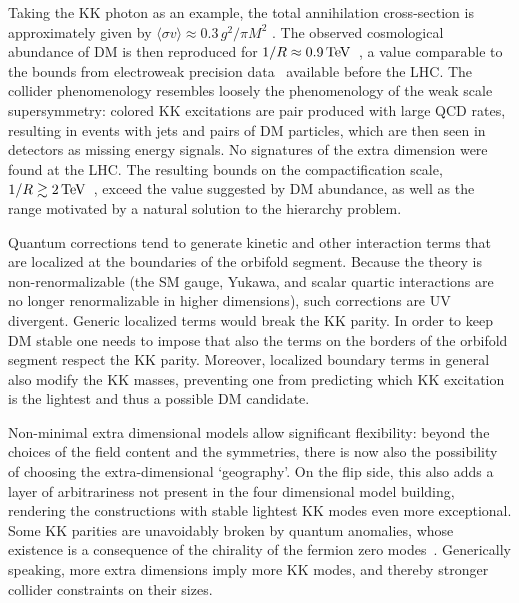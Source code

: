 \smallskip

Taking the KK photon as an example, the total annihilation cross-section is approximately given by 
$\langle \sigma v\rangle \approx 0.3 \, g^2/\pi M^2$ \cite{xdimDM}.
The observed cosmological abundance of DM is then reproduced for $1/R \approx 0.9\,{\rm TeV}$~\cite{xdimDM}, 
a value comparable to the bounds from electroweak precision data~\cite{xdimDM} available before the LHC.
The collider phenomenology  resembles loosely the phenomenology of the weak scale supersymmetry:
colored KK excitations are pair produced with large QCD rates, resulting in events with jets and pairs of DM particles, which are then seen in detectors as missing energy signals.
No signatures of the extra dimension were found at the LHC. The resulting bounds on the
compactification scale, $1/R\gtrsim 2\,{\rm TeV}$~\cite{xdimDM}, exceed the value suggested by DM abundance,
as well as the range motivated by a natural solution to the hierarchy problem. 

\smallskip

Quantum corrections tend to generate kinetic and other interaction terms that are localized at the boundaries of the orbifold segment.
Because the theory is non-renormalizable
 (the SM gauge, Yukawa, and scalar quartic interactions are no longer renormalizable in higher dimensions),  such corrections are UV divergent.
Generic localized terms would break the KK parity.
In order to keep DM stable one needs to impose that also the terms on the borders of the orbifold segment respect the KK parity. 
Moreover,  localized boundary terms in general also modify the KK masses, preventing one from  predicting which KK excitation is the lightest and thus a possible DM candidate. 


Non-minimal extra dimensional models allow significant flexibility: beyond the choices of the field content and the symmetries, 
there is now also the possibility of choosing the extra-dimensional `geography'. 
On the flip side, this also adds a layer of arbitrariness not present in the four dimensional model building, 
rendering the constructions with stable lightest KK modes even more exceptional. 
Some KK parities are unavoidably broken by quantum anomalies, 
 whose existence is a consequence of the chirality of the fermion zero modes~\cite{xdimDMano}.
Generically speaking, more extra dimensions imply more KK modes, and thereby stronger collider constraints on their sizes.




